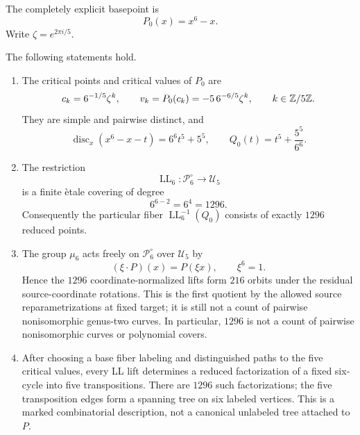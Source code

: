 The completely explicit basepoint is
\begin{equation}
 P_0(x)=x^6-x.
 \label{eq:sextic-base-polynomial}
\end{equation}
Write $\zeta=e^{2\pi i/5}$.

\begin{theorem}
\label{thm:sextic-ll-event-schedule}
The following statements hold.
\begin{enumerate}
\item The critical points and critical values of $P_0$ are
  \begin{equation}
   c_k=6^{-1/5}\zeta^k,
   \qquad
   v_k=P_0(c_k)=-5\,6^{-6/5}\zeta^k,
   \qquad k\in\mathbb{Z}/5\mathbb{Z}.
   \label{eq:sextic-critical-points-values}
  \end{equation}
  They are simple and pairwise distinct, and
  \begin{equation}
   \operatorname{disc}_x(x^6-x-t)=6^6t^5+5^5,
   \qquad
   Q_0(t)=t^5+\frac{5^5}{6^6}.
   \label{eq:sextic-explicit-discriminant}
  \end{equation}
\item The restriction
  \begin{equation}
   \operatorname{LL}_6:\mathcal P_6^\circ\longrightarrow\mathcal U_5
   \label{eq:sextic-ll-etale-cover}
  \end{equation}
  is a finite \`etale covering of degree
  \begin{equation}
   6^{6-2}=6^4=1296.
   \label{eq:sextic-ll-degree}
  \end{equation}
  Consequently the particular fiber
  $\operatorname{LL}_6^{-1}(Q_0)$ consists of exactly $1296$ reduced points.
\item The group $\mu_6$ acts freely on $\mathcal P_6^\circ$ over
  $\mathcal U_5$ by
  \begin{equation}
   (\xi\cdot P)(x)=P(\xi x),
   \qquad \xi^6=1.
   \label{eq:sextic-source-rotation-action}
  \end{equation}
  Hence the $1296$ coordinate-normalized lifts form $216$ orbits under the
  residual source-coordinate rotations.  This is the first quotient by the
  allowed source reparametrizations at fixed target; it is still not a count
  of pairwise nonisomorphic genus-two curves.  In particular, $1296$ is not a
  count of pairwise nonisomorphic curves or polynomial covers.
\item After choosing a base fiber labeling and distinguished paths to the five
  critical values, every LL lift determines a reduced factorization of a fixed
  six-cycle into five transpositions.  There are $1296$ such factorizations;
  the five transposition edges form a spanning tree on six labeled vertices.
  This is a marked combinatorial description, not a canonical unlabeled tree
  attached to $P$.
\end{enumerate}
\end{theorem}

